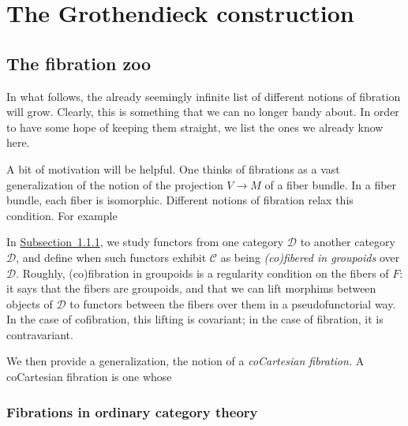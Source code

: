 \documentclass[main.tex]{subfiles}
\begin{document}
\newcommand{\ssmash}{\overset{\star}{\wedge}}

\chapter{The Grothendieck construction}
\label{ch:the_grothendieck_construction}

\section{The fibration zoo}
\label{sec:the_fibration_zoo}

In what follows, the already seemingly infinite list of different notions of fibration will grow. Clearly, this is something that we can no longer bandy about. In order to have some hope of keeping them straight, we list the ones we already know here.

A bit of motivation will be helpful. One thinks of fibrations as a vast generalization of the notion of the projection $V \to M$ of a fiber bundle. In a fiber bundle, each fiber is isomorphic. Different notions of fibration relax this condition. For example

In \hyperref[ssc:fibrations_in_ordinary_category_theory]{Subsection~\ref*{ssc:fibrations_in_ordinary_category_theory}}, we study functors from one category $\mathcal{D}$ to another category $\mathcal{D}$, and define when such functors exhibit $\mathcal{C}$ as being \emph{(co)fibered in groupoids} over $\mathcal{D}$. Roughly, (co)fibration in groupoids is a regularity condition on the fibers of $F$: it says that the fibers are groupoids, and that we can lift morphims between objects of $\mathcal{D}$ to functors between the fibers over them in a pseudofunctorial way. In the case of cofibration, this lifting is covariant; in the case of fibration, it is contravariant.

We then provide a generalization, the notion of a \emph{coCartesian fibration.} A coCartesian fibration is one whose

\subsection{Fibrations in ordinary category theory}
\label{ssc:fibrations_in_ordinary_category_theory}
\end{document}
